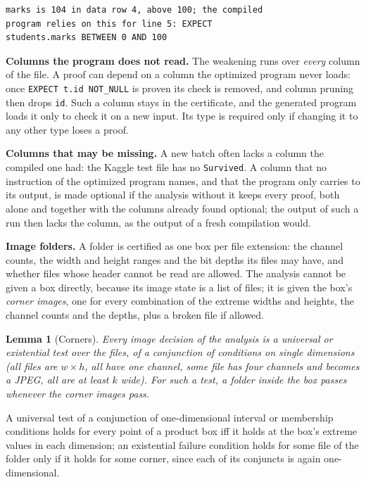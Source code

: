\documentclass[conference]{IEEEtran}
\newtheorem{lemma}{Lemma}
\begin{document}
\begin{lstlisting}[language={},numbers=none]
marks is 104 in data row 4, above 100; the compiled
program relies on this for line 5: EXPECT
students.marks BETWEEN 0 AND 100
\end{lstlisting}

\textbf{Columns the program does not read.} The weakening runs over \emph{every} column of the
file. A proof can depend on a column the optimized program never loads: once
\texttt{EXPECT t.id NOT\_NULL} is proven its check is removed, and column pruning then drops
\texttt{id}. Such a column stays in the certificate, and the generated program loads it only to
check it on a new input. Its type is required only if changing it to any other type loses a proof.

\textbf{Columns that may be missing.} A new batch often lacks a column the compiled one had: the
Kaggle test file has no \texttt{Survived}. A column that no instruction of the optimized program
names, and that the program only carries to its output, is made optional if the analysis without
it keeps every proof, both alone and together with the columns already found optional; the output
of such a run then lacks the column, as the output of a fresh compilation would.

\textbf{Image folders.} A folder is certified as one box per file extension: the channel counts,
the width and height ranges and the bit depths its files may have, and whether files whose header
cannot be read are allowed. The analysis cannot be given a box directly, because its image state is
a list of files; it is given the box's \emph{corner images}, one for every combination of the
extreme widths and heights, the channel counts and the depths, plus a broken file if allowed.

\begin{lemma}[Corners]\label{lem:corners}
Every image decision of the analysis is a universal or existential test over the files, of a
conjunction of conditions on single dimensions (all files are $w\times h$, all have one channel,
some file has four channels and becomes a JPEG, all are at least $k$ wide). For such a test, a
folder inside the box passes whenever the corner images pass.
\end{lemma}
\begin{IEEEproof}
A universal test of a conjunction of one-dimensional interval or membership conditions holds for
every point of a product box iff it holds at the box's extreme values in each dimension; an
existential failure condition holds for some file of the folder only if it holds for some corner,
since each of its conjuncts is again one-dimensional.
\end{IEEEproof}
\end{document}
